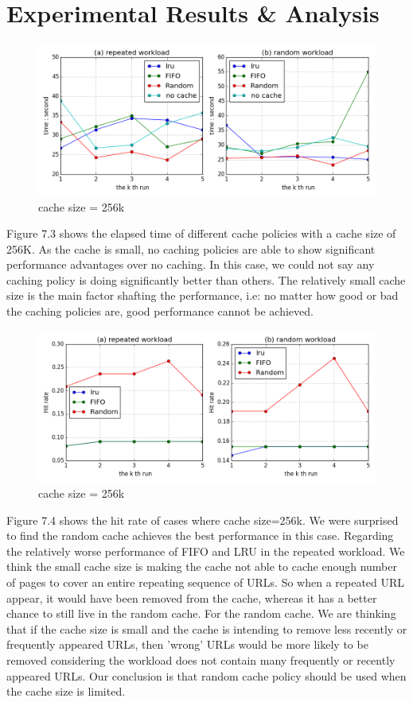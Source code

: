 \documentclass[paper=a4, fontsize=11pt]{scrartcl} %
\numberwithin{equation}{section} %
\numberwithin{figure}{section} %
\numberwithin{table}{section} %
\begin{document}
\section{Experimental Results \& Analysis}
\begin{figure}[h]
  \centering
  \includegraphics[width=\textwidth]{../data/time256k}
  \caption{cache size = 256k}
  \label{fig:time256k}
\end{figure}
Figure 7.3 shows the elapsed time of different cache policies with a cache size of 256K. As the cache is small, no caching policies are able to show significant performance advantages over no caching. In this case, we could not say any caching policy is doing significantly better than others. The relatively small cache size is the main factor shafting the performance, i.e: no matter how good or bad the caching policies are, good performance cannot be achieved.
\begin{figure}[h]
  \centering
  \includegraphics[width=\textwidth]{../data/hit256k}
  \caption{cache size = 256k}
  \label{fig:hit256k}
\end{figure}
Figure 7.4 shows the hit rate of cases where cache size=256k. We were surprised to find the random cache achieves the best performance in this case. Regarding the relatively worse performance of FIFO and LRU in the repeated workload. We think the small cache size is making the cache not able to cache enough number of pages to cover an entire repeating sequence of URLs. So when a repeated URL appear, it would have been removed from the cache, whereas it has a better chance to still live in the random cache. For the random cache. We are thinking that if the cache size is small and the cache is intending to remove less recently or frequently appeared URLs, then 'wrong' URLs would be more likely to be removed considering the workload does not contain many frequently or recently appeared URLs. Our conclusion is that random cache policy should be used when the cache size is limited.    
\end{document}

